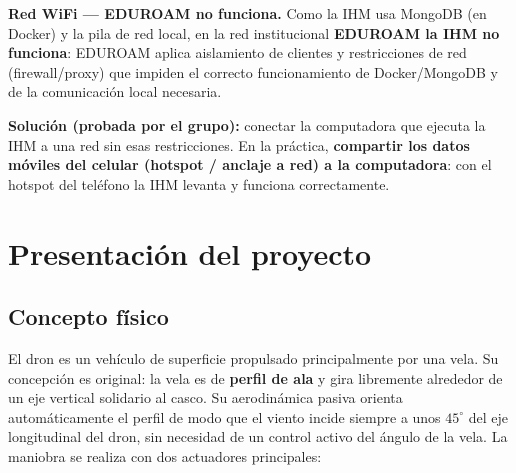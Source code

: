 \documentclass[12pt,a4paper]{article}
\begin{document}
\begin{warningbox}
  \textbf{Red WiFi --- EDUROAM no funciona.} Como la IHM usa MongoDB (en Docker) y la
  pila de red local, en la red institucional \textbf{EDUROAM la IHM no funciona}:
  EDUROAM aplica aislamiento de clientes y restricciones de red (firewall/proxy) que
  impiden el correcto funcionamiento de Docker/MongoDB y de la comunicaci\'on local
  necesaria.

  \textbf{Soluci\'on (probada por el grupo):} conectar la computadora que ejecuta la
  IHM a una red sin esas restricciones. En la pr\'actica, \textbf{compartir los datos
  m\'oviles del celular (hotspot / anclaje a red) a la computadora}: con el hotspot
  del tel\'efono la IHM levanta y funciona correctamente.
\end{warningbox}

\section{Presentaci\'on del proyecto}

\subsection{Concepto físico}

El dron es un veh\'iculo de superficie propulsado principalmente por una vela.
Su concepci\'on es original: la vela es de \textbf{perfil de ala} y gira libremente
alrededor de un eje vertical solidario al casco. Su aerodin\'amica pasiva orienta
autom\'aticamente el perfil de modo que el viento incide siempre a unos
$45^{\circ}$ del eje longitudinal del dron, sin necesidad de un control activo del
\'angulo de la vela. La maniobra se realiza con dos actuadores principales:
\end{document}
